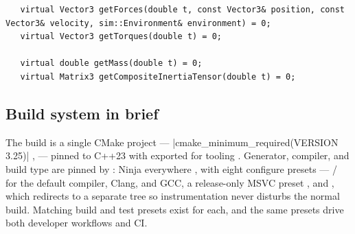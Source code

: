 \begin{listing}[htbp]
\begin{verbatim}
   virtual Vector3 getForces(double t, const Vector3& position, const Vector3& velocity, sim::Environment& environment) = 0;
   virtual Vector3 getTorques(double t) = 0;

   virtual double getMass(double t) = 0;
   virtual Matrix3 getCompositeInertiaTensor(double t) = 0;
\end{verbatim}
\caption{The model$\leftrightarrow$sim bridge : the
integrator needs forces, torques, and time-varying mass properties, and nothing else about
the rocket.}\label{lst:overview-propagatable}
\end{listing}

\subsection{Build system in brief}\label{sec:overview-build}

The build is a single CMake project --- \cppinline|cmake_minimum_required(VERSION 3.25)|
,   --- pinned to C++23
 with  exported for tooling
. Generator, compiler, and build type are pinned by
: Ninja everywhere , with eight configure
presets --- / for the default compiler, Clang, and GCC, a
release-only MSVC preset , and , which
redirects to a separate  tree  so
instrumentation never disturbs the normal build. Matching build and test presets exist for
each, and the same presets drive both developer workflows and CI.


